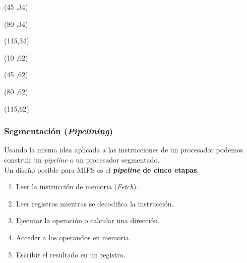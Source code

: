 \documentclass[aspectratio=169]{beamer}
\begin{document}
\begin{frame}[t,fragile]
    \begin{textblock}{80}(45 ,34)  \end{textblock}
    \begin{textblock}{80}(80 ,34)  \end{textblock}
    \begin{textblock}{80}(115,34)  \end{textblock}
    \begin{textblock}{80}(10 ,62)  \end{textblock}
    \begin{textblock}{80}(45 ,62)  \end{textblock}
    \begin{textblock}{80}(80 ,62)  \end{textblock}
    \begin{textblock}{80}(115,62)  \end{textblock}
\end{frame}

\begin{frame}[t,fragile]
    \frametitle{Segmentación (\emph{Pipelining})}
    Usando la misma idea aplicada a las instrucciones de un procesador podemos construir un \emph{pipeline} o un procesador segmentado.\\
    \bigskip
    \pause
    Un diseño posible para MIPS es el \textbf{\emph{pipeline} de cinco etapas}.
    \bigskip
    \begin{enumerate}
    \setlength\itemsep{0.2cm}
     \item Leer la instrucción de memoria (\emph{Fetch}).
     \item Leer registros mientras se decodifica la instrucción.
     \item Ejecutar la operación o calcular una dirección.
     \item Acceder a los operandos en memoria.
     \item Escribir el resultado en un registro.
    \end{enumerate}
\end{frame}
\end{document}
